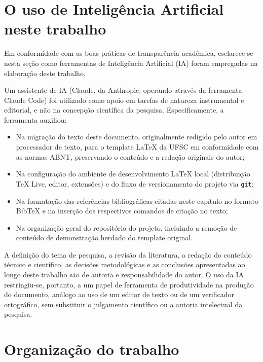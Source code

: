 \section{O uso de Inteligência Artificial neste trabalho}

Em conformidade com as boas práticas de transparência acadêmica,
esclarece-se nesta seção como ferramentas de Inteligência Artificial (IA)
foram empregadas na elaboração deste trabalho.

Um assistente de IA (Claude, da Anthropic, operando através da ferramenta
Claude Code) foi utilizado como apoio em tarefas de natureza instrumental e
editorial, e não na concepção científica da pesquisa. Especificamente, a
ferramenta auxiliou:

\begin{itemize}
    \item Na migração do texto deste documento, originalmente redigido pelo
    autor em processador de texto, para o template \LaTeX{} da UFSC em
    conformidade com as normas ABNT, preservando o conteúdo e a redação
    originais do autor;

    \item Na configuração do ambiente de desenvolvimento \LaTeX{} local
    (distribuição TeX Live, editor, extensões) e do fluxo de versionamento
    do projeto via \texttt{git};

    \item Na formatação das referências bibliográficas citadas neste
    capítulo no formato BibTeX e na inserção dos respectivos comandos de
    citação no texto;

    \item Na organização geral do repositório do projeto, incluindo a
    remoção de conteúdo de demonstração herdado do template original.
\end{itemize}

A definição do tema de pesquisa, a revisão da literatura, a redação do
conteúdo técnico e científico, as decisões metodológicas e as conclusões
apresentadas ao longo deste trabalho são de autoria e responsabilidade do
autor. O uso da IA restringiu-se, portanto, a um papel de ferramenta de
produtividade na produção do documento, análogo ao uso de um editor de
texto ou de um verificador ortográfico, sem substituir o julgamento
científico ou a autoria intelectual da pesquisa.

\section{Organização do trabalho}

